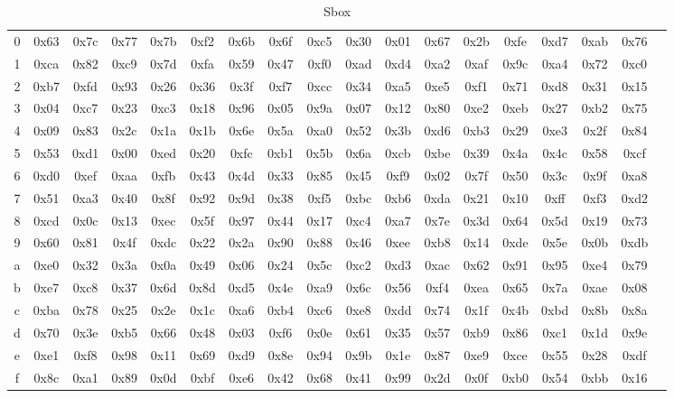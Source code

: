 \begin{table}[h]
{\begin{tabular}{c | c c c c c c c c c c c c c c c c c}
    0 & 0x63 & 0x7c & 0x77 & 0x7b & 0xf2 & 0x6b & 0x6f & 0xc5 & 0x30 & 0x01 & 0x67 & 0x2b & 0xfe & 0xd7 & 0xab & 0x76 \\  1 &  0xca & 0x82 & 0xc9 & 0x7d & 0xfa & 0x59 & 0x47 & 0xf0 & 0xad & 0xd4 & 0xa2 & 0xaf & 0x9c & 0xa4 & 0x72 & 0xc0 \\ 2 &  0xb7 & 0xfd & 0x93 & 0x26 & 0x36 & 0x3f & 0xf7 & 0xcc & 0x34 & 0xa5 & 0xe5 & 0xf1 & 0x71 & 0xd8 & 0x31 & 0x15 \\ 3 & 0x04 & 0xc7 & 0x23 & 0xc3 & 0x18 & 0x96 & 0x05 & 0x9a & 0x07 & 0x12 & 0x80 & 0xe2 & 0xeb & 0x27 & 0xb2 & 0x75 \\ 4 & 0x09 & 0x83 & 0x2c & 0x1a & 0x1b & 0x6e & 0x5a & 0xa0 & 0x52 & 0x3b & 0xd6 & 0xb3 & 0x29 & 0xe3 & 0x2f & 0x84 \\ 5 & 0x53 & 0xd1 & 0x00 & 0xed & 0x20 & 0xfc & 0xb1 & 0x5b & 0x6a & 0xcb & 0xbe & 0x39 & 0x4a & 0x4c & 0x58 & 0xcf \\ 6 & 0xd0 & 0xef & 0xaa & 0xfb & 0x43 & 0x4d & 0x33 & 0x85 & 0x45 & 0xf9 & 0x02 & 0x7f & 0x50 & 0x3c & 0x9f & 0xa8 \\ 7 & 0x51 & 0xa3 & 0x40 & 0x8f & 0x92 & 0x9d & 0x38 & 0xf5 & 0xbc & 0xb6 & 0xda & 0x21 & 0x10 & 0xff & 0xf3 & 0xd2 \\ 8 & 0xcd & 0x0c & 0x13 & 0xec & 0x5f & 0x97 & 0x44 & 0x17 & 0xc4 & 0xa7 & 0x7e & 0x3d & 0x64 & 0x5d & 0x19 & 0x73 \\ 9 & 0x60 & 0x81 & 0x4f & 0xdc & 0x22 & 0x2a & 0x90 & 0x88 & 0x46 & 0xee & 0xb8 & 0x14 & 0xde & 0x5e & 0x0b & 0xdb \\ a & 0xe0 & 0x32 & 0x3a & 0x0a & 0x49 & 0x06 & 0x24 & 0x5c & 0xc2 & 0xd3 & 0xac & 0x62 & 0x91 & 0x95 & 0xe4 & 0x79 \\ b & 0xe7 & 0xc8 & 0x37 & 0x6d & 0x8d & 0xd5 & 0x4e & 0xa9 & 0x6c & 0x56 & 0xf4 & 0xea & 0x65 & 0x7a & 0xae & 0x08 \\ c & 0xba & 0x78 & 0x25 & 0x2e & 0x1c & 0xa6 & 0xb4 & 0xc6 & 0xe8 & 0xdd & 0x74 & 0x1f & 0x4b & 0xbd & 0x8b & 0x8a \\ d & 0x70 & 0x3e & 0xb5 & 0x66 & 0x48 & 0x03 & 0xf6 & 0x0e & 0x61 & 0x35 & 0x57 & 0xb9 & 0x86 & 0xc1 & 0x1d & 0x9e \\ e & 0xe1 & 0xf8 & 0x98 & 0x11 & 0x69 & 0xd9 & 0x8e & 0x94 & 0x9b & 0x1e & 0x87 & 0xe9 & 0xce & 0x55 & 0x28 & 0xdf \\ f & 0x8c & 0xa1 & 0x89 & 0x0d & 0xbf & 0xe6 & 0x42 & 0x68 & 0x41 & 0x99 & 0x2d & 0x0f & 0xb0 & 0x54 & 0xbb & 0x16 \\
  \end{tabular}
  }
  \caption{Sbox}
  \label{t:sbox}
\end{table}

